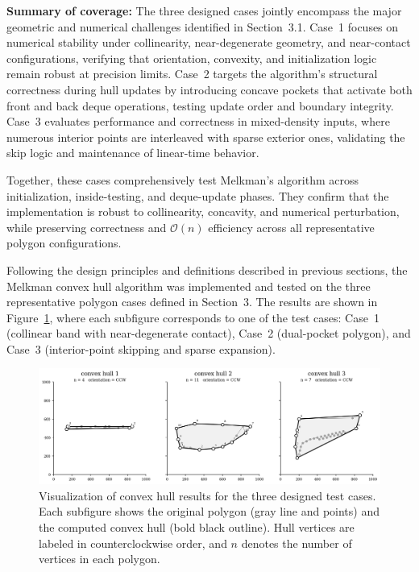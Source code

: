 \documentclass{article}
\begin{document}
\textbf{Summary of coverage:}
The three designed cases jointly encompass the major geometric and numerical challenges identified in Section~3.1. 
Case~1 focuses on numerical stability under collinearity, near-degenerate geometry, and near-contact configurations, verifying that orientation, convexity, and initialization logic remain robust at precision limits. 
Case~2 targets the algorithm’s structural correctness during hull updates by introducing concave pockets that activate both front and back deque operations, testing update order and boundary integrity. 
Case~3 evaluates performance and correctness in mixed-density inputs, where numerous interior points are interleaved with sparse exterior ones, validating the skip logic and maintenance of linear-time behavior.

Together, these cases comprehensively test Melkman’s algorithm across initialization, inside-testing, and deque-update phases. 
They confirm that the implementation is robust to collinearity, concavity, and numerical perturbation, while preserving correctness and $\mathcal{O}(n)$ efficiency across all representative polygon configurations.


Following the design principles and definitions described in previous sections, the Melkman convex hull algorithm was implemented and tested on the three representative polygon cases defined in Section~3. 
The results are shown in Figure~\ref{fig:hulls}, where each subfigure corresponds to one of the test cases: 
Case~1 (collinear band with near-degenerate contact), 
Case~2 (dual-pocket polygon), 
and Case~3 (interior-point skipping and sparse expansion).

\begin{figure}[H]
    \centering
    \includegraphics[width=0.95\linewidth]{Pictures/hulls.png}
    \caption{Visualization of convex hull results for the three designed test cases. 
    Each subfigure shows the original polygon (gray line and points) and the computed convex hull (bold black outline). 
    Hull vertices are labeled in counterclockwise order, and $n$ denotes the number of vertices in each polygon.}
    \label{fig:hulls}
\end{figure}
\end{document}
